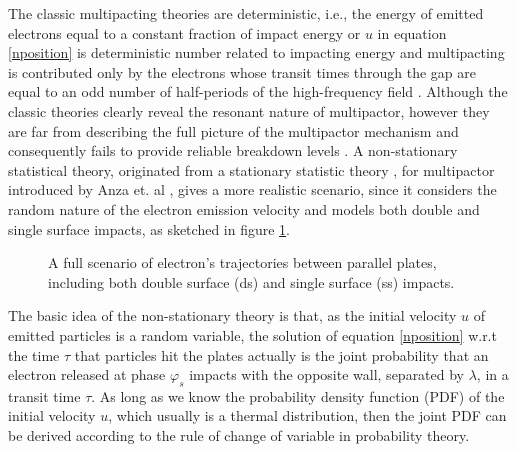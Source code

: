 \documentclass[aps,prstab,superscriptaddress,showpacs]{revtex4-1}
\begin{document}
The classic multipacting theories are deterministic, i.e., the energy of emitted electrons equal to a constant fraction of impact energy or $u$ in equation \eqref{nposition} is deterministic number related to impacting energy and multipacting is contributed only by the electrons whose transit times through the gap are equal to an odd number of half-periods of the high-frequency field \cite{ST}. Although the classic theories clearly reveal the resonant nature of multipactor, however they are far from describing the full picture of the multipactor mechanism and consequently fails to provide reliable breakdown levels \cite{Non}. A non-stationary statistical theory, originated from a stationary statistic theory \cite{ST}, for multipactor introduced by Anza et. al \cite{Non}, gives a more realistic scenario, since it considers the random nature of the electron emission velocity and models both double and single surface impacts, as sketched in figure \ref{fig:ss-ds}.
\begin{figure}[H]
\begin{center}

\end{center}
\caption{ A full scenario of electron's trajectories between parallel plates, including both double surface (ds) and single surface (ss) impacts. \cite{Non}\label{fig:ss-ds}}
\end{figure}

The basic idea of the non-stationary theory is that, as the initial velocity $u$ of emitted particles is a random variable, the solution of equation \eqref{nposition} w.r.t the time $\tau$ that particles hit the plates actually is the joint probability that an electron released at phase $\varphi_s$ impacts with the opposite wall, separated by $\lambda$, in a transit time $\tau$. As long as we know the probability density function (PDF) of the initial velocity $u$, which usually is a thermal distribution, then the joint PDF can be derived according to the rule of change of variable in probability theory. 
\end{document}
